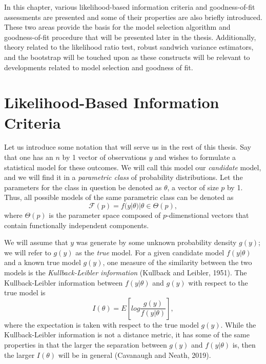 \doublespace
{}
		In this chapter, various likelihood-based information criteria and goodness-of-fit assessments are presented and some of their properties are also briefly introduced.
		These two areas provide the basis for the model selection algorithm and goodness-of-fit procedure that will be presented later in the thesis. Additionally, theory
		related to the likelihood ratio test, robust sandwich variance estimators, and the bootstrap will be touched upon as these constructs will be relevant to developments
		related to model selection and goodness of fit.
		
		\section{Likelihood-Based Information Criteria}

		Let us introduce some notation that will serve us in the rest of this thesis. Say that one has an $n$ by 1  vector of observations $y$ and wishes to formulate a
		statistical model for these outcomes. We will call this model our \textit{candidate} model, and we will find it in a \textit{parametric class} of probability distributions.
		Let the parameters for the class in question be denoted as $\theta$, a vector of size $p$ by 1. Thus, all possible models of the same parametric class can be denoted
		as
		\begin{equation}
			\mathcal{F}(p) = {f(y|\theta) | \theta \in \Theta(p)},
		\end{equation}
		where $\Theta(p)$ is the parameter space composed of $p$-dimenstional vectors that contain functionally independent components.

		We will assume that $y$ was generate by some unknown probability density $g(y)$; we will refer to $g(y)$ as the \textit{true} model. For a given candidate model $f(y|\theta)$
		and a known true model $g(y)$, one measure of the similarity between the two models is the \textit{Kullback-Leibler information} (Kullback and Leibler, 1951). The Kullback-Leibler
		information between $f(y|\theta)$ and $g(y)$ with respect to the true model is
		\begin{equation}
			I(\theta) = E \left[ log \frac{g(y)}{f(y|\theta)} \right],
		\end{equation}
		where the expectation is taken with respect to the true model $g(y)$. While the Kullback-Leibler information is not a distance metric, it has some of the same properties in
		that the larger the separation between $g(y)$ and $f(y|\theta)$ is, then the larger $I(\theta)$ will be in general (Cavanaugh and Neath, 2019).
		
